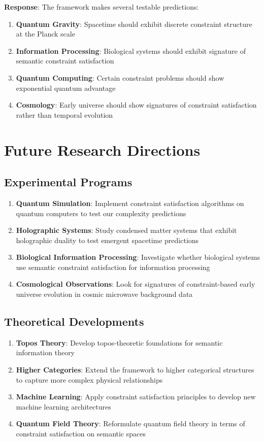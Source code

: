 \documentclass[11pt]{article}
\theoremstyle{definition}
\begin{document}
\textbf{Response}: The framework makes several testable predictions:

\begin{enumerate}
\item \textbf{Quantum Gravity}: Spacetime should exhibit discrete constraint structure at the Planck scale
\item \textbf{Information Processing}: Biological systems should exhibit signature of semantic constraint satisfaction
\item \textbf{Quantum Computing}: Certain constraint problems should show exponential quantum advantage
\item \textbf{Cosmology}: Early universe should show signatures of constraint satisfaction rather than temporal evolution
\end{enumerate}

\section{Future Research Directions}

\subsection{Experimental Programs}

\begin{enumerate}
\item \textbf{Quantum Simulation}: Implement constraint satisfaction algorithms on quantum computers to test our complexity predictions
\item \textbf{Holographic Systems}: Study condensed matter systems that exhibit holographic duality to test emergent spacetime predictions
\item \textbf{Biological Information Processing}: Investigate whether biological systems use semantic constraint satisfaction for information processing
\item \textbf{Cosmological Observations}: Look for signatures of constraint-based early universe evolution in cosmic microwave background data
\end{enumerate}

\subsection{Theoretical Developments}

\begin{enumerate}
\item \textbf{Topos Theory}: Develop topos-theoretic foundations for semantic information theory
\item \textbf{Higher Categories}: Extend the framework to higher categorical structures to capture more complex physical relationships
\item \textbf{Machine Learning}: Apply constraint satisfaction principles to develop new machine learning architectures
\item \textbf{Quantum Field Theory}: Reformulate quantum field theory in terms of constraint satisfaction on semantic spaces
\end{enumerate}
\end{document}
